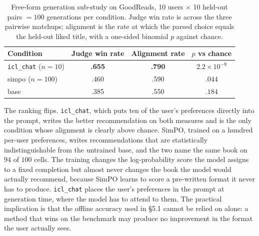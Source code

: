 \begin{table}[!ht]
\centering
\caption{Free-form generation sub-study on GoodReads, 10 users $\times$ 10 held-out pairs $= 100$ generations per condition. Judge win rate is across the three pairwise matchups; alignment is the rate at which the parsed choice equals the held-out liked title, with a one-sided binomial $p$ against chance.}
\label{tab:judge_results}
\begin{tabular}{lccc}
\toprule
\textbf{Condition} & \textbf{Judge win rate} & \textbf{Alignment rate} & $p$ vs chance \\
\midrule
\texttt{icl\_chat} ($n = 10$) & \textbf{.655} & \textbf{.790} & $2.2 \times 10^{-9}$ \\
simpo ($n = 100$)             & .460          & .590          & $.044$ \\
base                          & .385          & .550          & $.184$ \\
\bottomrule
\end{tabular}
\end{table}

The ranking flips. \texttt{icl\_chat}, which puts ten of the user's preferences directly into the prompt, writes the better recommendation on both measures and is the only condition whose alignment is clearly above chance. SimPO, trained on a hundred per-user preferences, writes recommendations that are statistically indistinguishable from the untrained base, and the two name the same book on $94$ of $100$ cells. The training changes the log-probability score the model assigns to a fixed completion but almost never changes the book the model would actually recommend, because SimPO learns to score a pre-written format it never has to produce. \texttt{icl\_chat} places the user's preferences in the prompt at generation time, where the model has to attend to them. The practical implication is that the offline accuracy used in §5.1 cannot be relied on alone: a method that wins on the benchmark may produce no improvement in the format the user actually sees.

\FloatBarrier